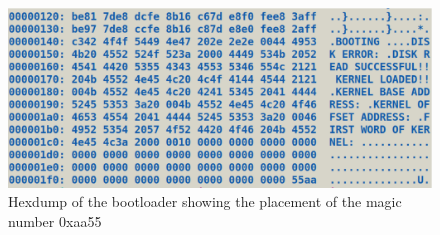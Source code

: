 \begin{figure}[h]
  \centering
  \includegraphics[scale=0.30]{figures/boothexdump.eps}
  \caption{Hexdump of the bootloader showing the placement of the magic number 0xaa55}
\label{fig:boothexdump}
\end{figure}

